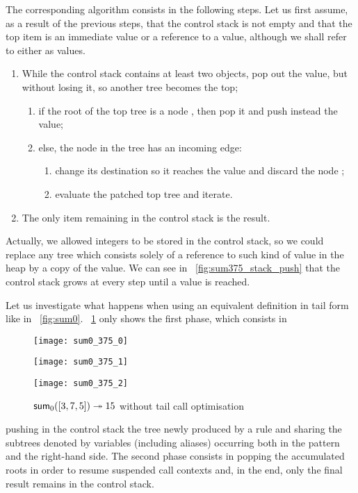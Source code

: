 The corresponding algorithm consists in the following steps. Let us
first assume, as a result of the previous steps, that the control
stack is not empty and that the top item is an immediate value or a
reference to a value, although we shall refer to either as values.
\begin{enumerate}

  \item While the control stack contains at least two objects, pop out
    the value, but without losing it, so another tree becomes the top;
    \begin{enumerate}

    \item if the root of the top tree is a node , then
      pop it and push instead the value;

    \item else, the node  in the tree has an incoming edge:
      \begin{enumerate}

      \item change its destination so it reaches the value and discard
        the node ;

      \item evaluate the patched top tree and iterate.

      \end{enumerate}

    \end{enumerate}

  \item The only item remaining in the control stack is the result.

\end{enumerate}
Actually, we allowed integers to be stored in the control stack, so we could replace any tree which consists solely of a reference to such kind of value in the heap by a copy of the value.  We can see in \fig~\ref{fig:sum375_stack_push} that the control stack grows at every step until a value is reached.   


Let us investigate what happens when using an equivalent definition in
tail form like  in \fig~\vref{fig:sum0}.
\Fig~\ref{fig:sum0_375} only shows the first phase, which consists in
\begin{figure}[!t]
\centering
\texttt{[image: sum0\_375\_0]}

\texttt{[image: sum0\_375\_1]}

\texttt{[image: sum0\_375\_2]}
\caption{\(\textsf{sum}_0([3,7,5]) \twoheadrightarrow 15\)
  without tail call optimisation}
\label{fig:sum0_375}
\end{figure}
pushing in the control stack the tree newly produced by a rule and
sharing the subtrees denoted by variables (including aliases)
occurring both in the pattern and the right\hyp{}hand side. The second
phase consists in popping the accumulated roots in order to resume
suspended call contexts and, in the end, only the final result remains
in the control stack.

